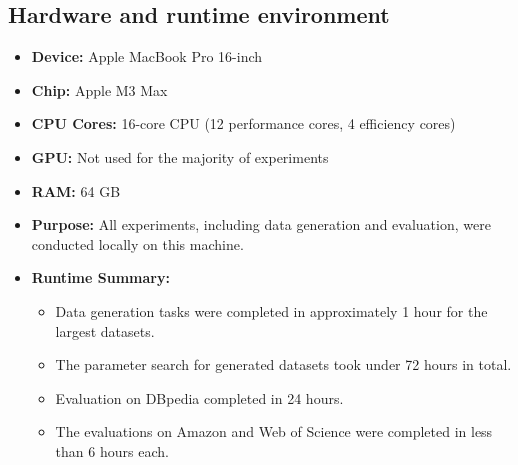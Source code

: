 \subsection{Hardware and runtime environment}
\begin{itemize}
  \item \textbf{Device:} Apple MacBook Pro 16-inch
  \item \textbf{Chip:} Apple M3 Max
  \item \textbf{CPU Cores:} 16-core CPU (12 performance cores, 4 efficiency cores)
  \item \textbf{GPU:} Not used for the majority of experiments
  \item \textbf{RAM:} 64 GB
  \item \textbf{Purpose:} All experiments, including data generation and evaluation, were conducted locally on this machine.
  \item \textbf{Runtime Summary:}
  \begin{itemize}
    \item Data generation tasks were completed in approximately 1 hour for the largest datasets.
    \item The parameter search for generated datasets took under 72 hours in total.
    \item Evaluation on DBpedia completed in 24 hours.
    \item The evaluations on Amazon and Web of Science were completed in less than 6 hours each.
  \end{itemize}
\end{itemize}



% 

